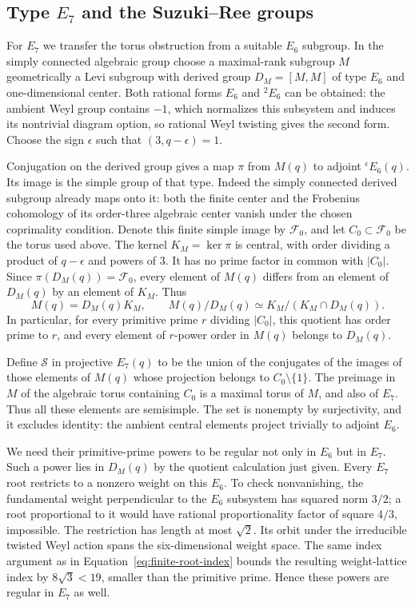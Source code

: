 \subsection{Type \texorpdfstring{$E_7$}{E7} and the Suzuki--Ree groups}

For $E_7$ we transfer the torus obstruction from a suitable $E_6$
subgroup. In the simply connected algebraic group choose a
maximal-rank subgroup $M$ geometrically a Levi subgroup with
derived group $D_M=[M,M]$ of type $E_6$ and one-dimensional center. Both
rational forms $E_6$ and ${}^2E_6$ can be obtained: the ambient
Weyl group contains $-1$, which normalizes this subsystem and
induces its nontrivial diagram option, so rational Weyl twisting
gives the second form. Choose the sign $\epsilon$ such that
$(3,q-\epsilon)=1$.

Conjugation on the derived group gives a map $\pi$ from $M(q)$ to
adjoint ${}^{\epsilon}E_6(q)$. Its image is the simple group of
that type. Indeed the simply connected derived subgroup already
maps onto it: both the finite center and the Frobenius cohomology
of its order-three algebraic center vanish under the chosen
coprimality condition. Denote this finite simple image by
$\mathcal F_0$, and let $C_0\subset\mathcal F_0$ be the torus used
above. The kernel $K_M=\ker\pi$ is central, with order
dividing a product of $q-\epsilon$ and powers of $3$. It has no
prime factor in common with $|C_0|$.
Since $\pi(D_M(q))=\mathcal F_0$, every element of $M(q)$ differs
from an element of $D_M(q)$ by an element of $K_M$. Thus
\[
 M(q)=D_M(q)K_M,\qquad
 M(q)/D_M(q)\simeq K_M/(K_M\cap D_M(q)).
\]
In particular, for every primitive prime $r$ dividing $|C_0|$,
this quotient has order prime to $r$, and every element of
$r$-power order in $M(q)$ belongs to $D_M(q)$.

Define $\mathcal S$ in projective $E_7(q)$ to be the union of the
conjugates of the images of those elements of $M(q)$ whose
projection belongs to $C_0\setminus\{1\}$. The preimage in $M$
of the algebraic torus containing $C_0$ is a maximal torus of
$M$, and also of $E_7$. Thus all these elements are semisimple.
The set is nonempty by surjectivity, and it excludes identity:
the ambient central elements project trivially to adjoint $E_6$.

We need their primitive-prime powers to be regular not only in
$E_6$ but in $E_7$. Such a power lies in $D_M(q)$ by the quotient
calculation just given. Every $E_7$
root restricts to a nonzero weight on this $E_6$. To check
nonvanishing, the fundamental weight perpendicular to the $E_6$
subsystem has squared norm $3/2$; a root proportional to it would
have rational proportionality factor of square $4/3$, impossible.
The restriction has length at most $\sqrt2$. Its orbit under
the irreducible twisted Weyl action spans the six-dimensional
weight space. The same index argument as in
Equation~\eqref{eq:finite-root-index} bounds the resulting
weight-lattice index by $8\sqrt3<19$, smaller than the primitive
prime. Hence these powers are regular in $E_7$ as well.

